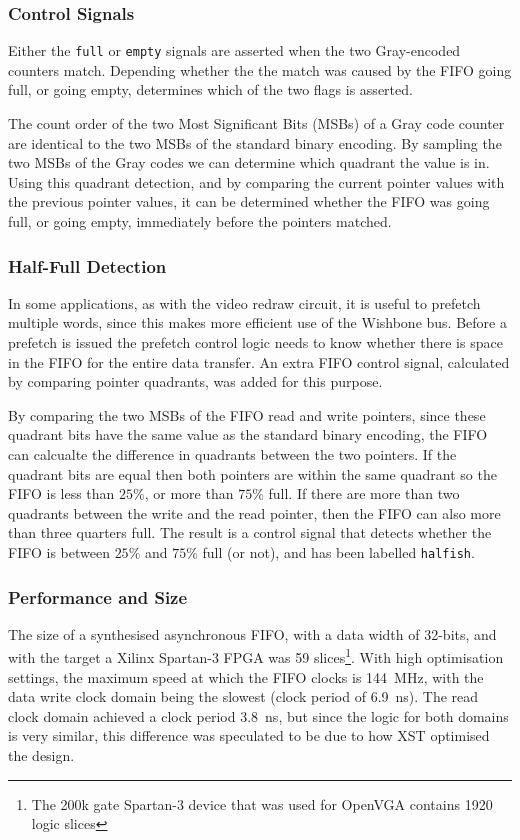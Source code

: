 \subsubsection{Control Signals}
Either the \texttt{full} or \texttt{empty} signals are asserted when the two
Gray-encoded counters match. Depending whether the the match was caused by the
FIFO going full, or going empty, determines which of the two flags is asserted.

The count order of the two Most Significant Bits (MSBs) of a Gray code counter are identical
to the two MSBs of the standard binary encoding. By sampling the two MSBs of the
Gray codes we can determine which quadrant the value is in. Using this quadrant
detection, and by comparing the current pointer values with the previous pointer
values, it can be determined whether the FIFO was going full, or going empty,
immediately before the pointers matched.


\subsubsection{Half-Full Detection}
In some applications, as with the video redraw circuit, it is useful to prefetch
multiple words, since this makes more efficient use of the Wishbone bus. Before a
prefetch is issued the prefetch control logic needs to know whether there is
space in the FIFO for the entire data transfer. An extra FIFO control signal,
calculated by comparing pointer quadrants, was added for this purpose.

By comparing the two MSBs of the FIFO read and write pointers, since these
quadrant bits have the same value as the standard binary encoding, the FIFO can
calcualte the difference in quadrants between the two pointers. If the quadrant
bits are equal then both pointers are within the same quadrant so the FIFO is
less than $25\%$, or more than $75\%$ full. If there are more than two quadrants
between the write and the read pointer, then the FIFO can also more than three
quarters full. The result is a control signal that detects whether the FIFO is
between $25\%$ and $75\%$ full (or not), and has been labelled \texttt{halfish}.


\subsubsection{Performance and Size}
\label{CLOCK_FIFO_Synth}

The size of a synthesised asynchronous FIFO, with a data width of 32-bits, and
with the target a Xilinx Spartan-3 FPGA was 59 slices\footnote{The 200k gate
Spartan-3 device that was used for OpenVGA contains 1920 logic slices}. With high
optimisation settings, the maximum speed at which the FIFO clocks is 144~MHz,
with the data write clock domain being the slowest (clock period of 6.9~ns). The
read clock domain achieved a clock period 3.8~ns, but since the logic for both
domains is very similar, this difference was speculated to be due to how XST
optimised the design.



